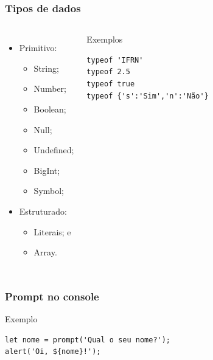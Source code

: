\documentclass[aspectratio=169]{beamer} %
\begin{document}
\begin{frame}[fragile]
	\frametitle{Tipos de dados}
	
	\begin{columns}[c]
	
	\begin{itemize}
		\item Primitivo:
		\begin{itemize}
			\item String;
			\item Number;
			\item Boolean;
			\item Null;
			\item Undefined;
			\item BigInt;
			\item Symbol;
		\end{itemize}
		\item Estruturado:
		\begin{itemize}
			\item Literais; e
			\item Array.
		\end{itemize}
	\end{itemize} \vfill
	
	\begin{exampleblock}{Exemplos}
		\begin{lstlisting}
typeof 'IFRN'
typeof 2.5
typeof true
typeof {'s':'Sim','n':'Não'}
		\end{lstlisting}
	\end{exampleblock}
	\end{columns}
\end{frame}

\begin{frame}[fragile]
	\frametitle{Prompt no console}
	
	\begin{exampleblock}{Exemplo}
		\begin{lstlisting}
let nome = prompt('Qual o seu nome?');
alert('Oi, ${nome}!');
		\end{lstlisting}
	\end{exampleblock}
\end{frame}
\end{document}
